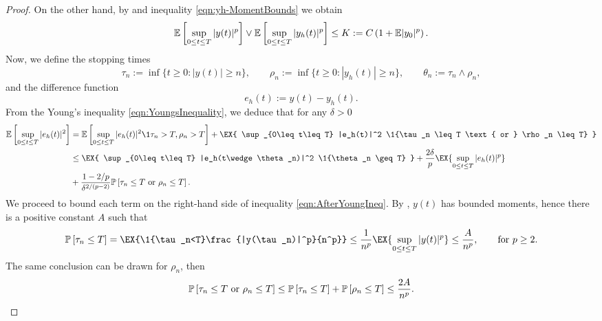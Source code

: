 \begin{proof}
		On the other hand, by  and inequality \eqref{eqn:yh-MomentBounds} we obtain
	\begin{equation*}
		\mathbb{E}\left[
			\sup_{0\leq t \leq T}
				|y(t)|^p
		\right]
		\vee
		\mathbb{E}\left[
			\sup_{0\leq t \leq T}
				|y_h(t)|^p
		\right]
		\leq
		K := C
		\left( 
			1+\mathbb{E}|y_0|^p
		\right).
	\end{equation*}
	Now, we define the stopping times
	\begin{equation}\label{eqn:StoppingTimes}
		\tau_n := 
			\inf\{
				t\geq 0: |y(t)|\geq n
			\},
		\qquad
		\rho_n := 
			\inf\{
				t\geq 0: |y_h(t)|\geq n
			\},
		\qquad
		\theta_n:=
			\tau_n \wedge \rho_n,
	\end{equation}
	and the difference function
	\begin{equation*}
		e_h(t):= y(t) - y_h(t).
	\end{equation*}
	From the Young's inequality \eqref{eqn:YoungsInequality}, we deduce that for any $\delta>0$ 
	\begin{align}
		\m\left[
			\sup_{0\leq t\leq T}
			|e_h(t)|^2
		\right]
		&=
			\m\left[
				\sup_{0\leq t\leq T}
				|e_h(t)|^2
				\1{\tau_n>T,\rho_n>T}
			\right]
			+
			\EX{
				\sup_{0\leq t\leq T}
				|e_h(t)|^2
				\1{\tau_n \leq T \text{ or } \rho_n \leq T}
			}\notag\\
		&\leq
			\EX{
				\sup_{0\leq t\leq T}
				|e_h(t\wedge \theta_n)|^2
				\1{\theta_n \geq T}
			}
			+\frac{2\delta}{p}
			\EX{
				\sup_{0\leq t\leq T}
				|e_h(t)|^p 
			}\notag \\
		&+
			\frac{1-2/p}{\delta^{2/(p-2)}}
			\Prob{\tau_n \leq T \text{ or } \rho_n \leq T}.
	\label{eqn:AfterYoungIneq}
	\end{align}
	We proceed to bound each term on the right-hand side of inequality \eqref{eqn:AfterYoungIneq}.
	By , $y(t)$ has bounded moments, hence 
	there is a positive constant $A$ such that
	\begin{equation}\label{eqn:BoundProbTauR}
		\Prob{\tau_n\leq T}
		=
			\EX{\1{\tau_n<T}\frac{|y(\tau_n)|^p}{n^p}}
		\leq
			\frac{1}{n^p}\EX{\sup_{0\leq t\leq T}|y(t)|^p} \leq \frac{A}{n^p},
			\qquad \text{for } p\geq 2.
	\end{equation}
	The same conclusion can be drawn for $\rho_n$, then
	\begin{equation} \label{eqn:BoundProbTauRorRhoR}
		\mathbb{P}\left[\tau_n \leq T \text{ or } \rho_n \leq T\right]
		\leq
			\mathbb{P}\left[\tau_n\leq T\right]+\mathbb{P}\left[\rho_n\leq T\right]
		\leq
		\frac{2A}{n^p}.
	\end{equation}

\end{proof}
